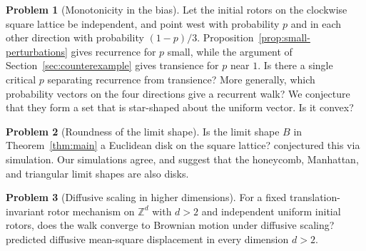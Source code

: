 \documentclass[11pt]{amsart}
\theoremstyle{plain}
\theoremstyle{definition}
\newtheorem{problem}{Problem}
\newcommand{\Z}{\mathbb Z}
\begin{document}
	\begin{problem}[Monotonicity in the bias]
		Let the initial rotors on the clockwise square lattice be independent, and
		point west with probability $p$ and in each other direction with probability
		$(1-p)/3$.
		Proposition~\ref{prop:small-perturbations} gives recurrence for $p$ small, while the argument of Section~\ref{sec:counterexample} gives transience
		for $p$ near $1$.  Is there a single critical $p$ separating recurrence from
		transience?  More generally, which probability vectors on the four directions
		give a recurrent walk?  We conjecture that they form a set that is star-shaped
		about the uniform vector.  Is it convex?
	\end{problem}

	\begin{problem}[Roundness of the limit shape]
		Is the limit shape $B$ in Theorem~\ref{thm:main} a Euclidean disk on the square
		lattice?  \citet{KapriDhar2009} conjectured this via simulation. Our simulations agree, and suggest that the
		honeycomb, Manhattan, and triangular limit shapes are also disks. 
	\end{problem}

	\begin{problem}[Diffusive scaling in higher dimensions]
		For a fixed translation-invariant rotor mechanism on $\Z^d$ with $d>2$ and
		independent uniform initial rotors, does the walk converge to Brownian motion
		under diffusive scaling?  \citet{PriezzhevDharDharKrishnamurthy1996} predicted
		diffusive mean-square displacement in every dimension $d>2$.
	\end{problem}
\end{document}
